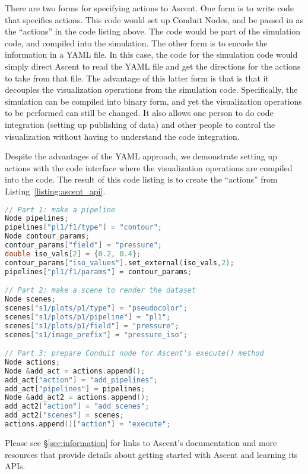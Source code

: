 There are two forms for specifying actions to Ascent.
%
One form is to write code that specifies actions.
%
This code would set up Conduit Nodes, and be passed in as the ``actions'' in the
code listing above.
%
The code would be part of the simulation code, and compiled into the simulation.
%
The other form is to encode the information in a YAML file.
%
In this case, the code for the simulation code would simply direct Ascent to read
the YAML file and get the directions for the actions to take from that file.
%
The advantage of this latter form is that is that it decouples the visualization
operations from the simulation code.
%
Specifically, the simulation can be compiled into binary form, and yet the visualization
operations to be performed can still be changed.
%
It also allows one person to do code integration (setting up publishing of data)
and other people to control the visualization without having to understand
the code integration.

Despite the advantages of the YAML approach, we demonstrate setting up actions with
the code interface where the visualization operations are compiled into the code.
%
The result of this code listing is to create the ``actions'' from Listing~\ref{listing:ascent_api}.

\begin{lstlisting}[language=C++,caption={\label{listing:actions}Setting up Ascent actions using the C++ bindings.
%
This listing is broken into three parts.  
%
The first part makes a pipeline named ``pl1'' with one filter named ``f1.''
%
The second part makes a scene named ``s1'' which is connected to pipeline ``pl1.''
%
The third part tells Ascent to add the pipeline, add the scene, and then execute both.
}]
// Part 1: make a pipeline
Node pipelines;
pipelines["pl1/f1/type"] = "contour";
Node contour_params;
contour_params["field"] = "pressure";
double iso_vals[2] = {0.2, 0.4};
contour_params["iso_values"].set_external(iso_vals,2);
pipelines["pl1/f1/params"] = contour_params;

// Part 2: make a scene to render the dataset
Node scenes;
scenes["s1/plots/p1/type"] = "pseudocolor";
scenes["s1/plots/p1/pipeline"] = "pl1";
scenes["s1/plots/p1/field"] = "pressure";
scenes["s1/image_prefix"] = "pressure_iso";

// Part 3: prepare Conduit node for Ascent's execute() method
Node actions;
Node &add_act = actions.append();
add_act["action"] = "add_pipelines";
add_act["pipelines"] = pipelines;
Node &add_act2 = actions.append();
add_act2["action"] = "add_scenes";
add_act2["scenes"] = scenes;
actions.append()["action"] = "execute";
\end{lstlisting}


Please see \S\ref{sec:information} for links to Ascent's documentation and more resources that
provide details about getting started with Ascent and learning its APIs.


